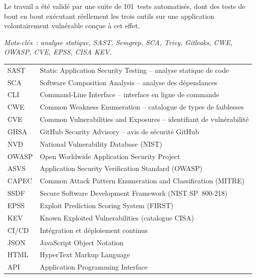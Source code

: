 \documentclass[12pt,a4paper,oneside]{report}
\begin{document}
Le travail a \'et\'e valid\'e par une suite de 101~tests automatis\'es, dont des tests de bout en bout ex\'ecutant r\'eellement les trois outils sur une application volontairement vuln\'erable con\c{c}ue \`a cet effet.

\textit{Mots-cl\'es~: analyse statique, SAST, Semgrep, SCA, Trivy, Gitleaks, CWE, OWASP, CVE, EPSS, CISA KEV.}

\tableofcontents
\clearpage
\thispagestyle{front}

\begin{tabularx}{\linewidth}{@{}p{3.1cm}X@{}}
SAST & Static Application Security Testing -- analyse statique de code \\
SCA & Software Composition Analysis -- analyse des d\'ependances \\
CLI & Command-Line Interface -- interface en ligne de commande \\
CWE & Common Weakness Enumeration -- catalogue de types de faiblesses \\
CVE & Common Vulnerabilities and Exposures -- identifiant de vuln\'erabilit\'e \\
GHSA & GitHub Security Advisory -- avis de s\'ecurit\'e GitHub \\
NVD & National Vulnerability Database (NIST) \\
OWASP & Open Worldwide Application Security Project \\
ASVS & Application Security Verification Standard (OWASP) \\
CAPEC & Common Attack Pattern Enumeration and Classification (MITRE) \\
SSDF & Secure Software Development Framework (NIST SP~800-218) \\
EPSS & Exploit Prediction Scoring System (FIRST) \\
KEV & Known Exploited Vulnerabilities (catalogue CISA) \\
CI/CD & Int\'egration et d\'eploiement continus \\
JSON & JavaScript Object Notation \\
HTML & HyperText Markup Language \\
API & Application Programming Interface \\
\end{tabularx}

\listoffigures

\listoftables

\clearpage
{}
\pagestyle{fancy}
\end{document}
